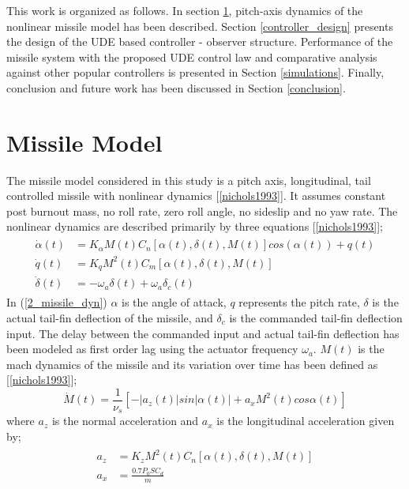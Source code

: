 \documentclass[conference]{IEEEtran}
\begin{document}
	This work is organized as follows. In section \ref{missile_model}, pitch-axis dynamics of the nonlinear missile model has been described. Section \ref{controller_design} presents the design of the UDE based controller - observer structure. Performance of the missile system with the proposed UDE control law and comparative analysis against other popular controllers is presented in Section \ref{simulations}. Finally, conclusion and future work has been discussed in Section \ref{conclusion}.	
	
\section{Missile Model} \label{missile_model}

	The missile model considered in this study is a pitch axis, longitudinal, tail controlled missile with nonlinear dynamics [\ref{nichols1993}]. It assumes constant post burnout mass, no roll rate, zero roll angle, no sideslip and no yaw rate. The nonlinear dynamics are described primarily by three equations [\ref{nichols1993}]; 
	\begin{eqnarray}
		\begin{aligned}
		\label{2_missile_dyn}
			\dot{\alpha}(t)	&=	K_\alpha M(t) C_n [\alpha(t),\delta(t),M(t)]cos(\alpha(t)) + q(t) \\
			\dot{q}(t)		&=	K_q M^2(t) C_m [\alpha(t),\delta(t),M(t)] \\
			\dot{\delta}(t)	&=	-\omega_a\delta(t) + \omega_a\delta_c(t)
		\end{aligned}
	\end{eqnarray}
	In (\ref{2_missile_dyn}) $\alpha$ is the angle of attack, $q$ represents the pitch rate, $\delta$ is the actual tail-fin deflection of the missile, and $\delta_c$ is the commanded tail-fin deflection input. The delay between the commanded input and actual tail-fin deflection has been modeled as first order lag using the actuator frequency $\omega_a$. $M(t)$ is the mach dynamics of the missile and its variation over time has been defined as [\ref{nichols1993}];
	\begin{equation}
	\label{mach_dyn}
		\dot{M}(t)=\frac{1}{\nu_s}[-|a_z(t)|sin|\alpha(t)|+a_xM^2(t)cos\alpha(t)]
	\end{equation}
	where $a_z$ is the normal acceleration and $a_x$ is the longitudinal acceleration given by;	
	\begin{eqnarray}
		\begin{aligned}
		a_z &= K_z M^2(t)C_n[\alpha(t),\delta(t),M(t)]\\
		a_x &= \frac{0.7P_0SC_d}{m}
		\end{aligned}
	\end{eqnarray}
\end{document}
